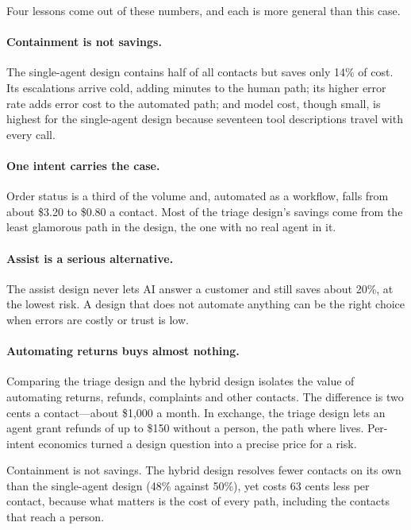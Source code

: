Four lessons come out of these numbers, and each is more general than this case.

\paragraph{Containment is not savings.} The single-agent design contains half of all contacts but saves only 14\% of cost. Its escalations arrive cold, adding minutes to the human path; its higher error rate adds error cost to the automated path; and model cost, though small, is highest for the single-agent design because seventeen tool descriptions travel with every call.

\paragraph{One intent carries the case.} Order status is a third of the volume and, automated as a workflow, falls from about \$3.20 to \$0.80 a contact. Most of the triage design's savings come from the least glamorous path in the design, the one with no real agent in it.

\paragraph{Assist is a serious alternative.} The assist design never lets AI answer a customer and still saves about 20\%, at the lowest risk. A design that does not automate anything can be the right choice when errors are costly or trust is low.

\paragraph{Automating returns buys almost nothing.} Comparing the triage design and the hybrid design isolates the value of automating returns, refunds, complaints and other contacts. The difference is two cents a contact---about \$1{,}000 a month. In exchange, the triage design lets an agent grant refunds of up to \$150 without a person, the path where  lives. Per-intent economics turned a design question into a precise price for a risk.

\begin{keyidea}
Containment is not savings. The hybrid design resolves fewer contacts on its own than the single-agent design (48\% against 50\%), yet costs 63 cents less per contact, because what matters is the cost of every path, including the contacts that reach a person.
\end{keyidea}


